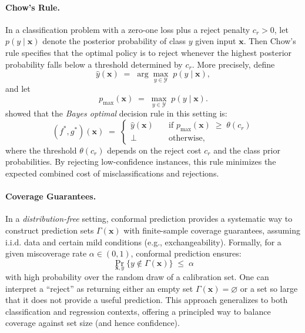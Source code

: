 \paragraph{Chow's Rule.}
In a classification problem with a zero-one loss plus a reject penalty $c_r > 0$, let $p(y \mid \bm{x})$ denote the posterior probability of class $y$ given input $\bm{x}$. Then Chow's rule \citep{chow1957optimum} specifies that the optimal policy is to reject whenever the highest posterior probability falls below a threshold determined by $c_r$. More precisely, define
\begin{equation}
\hat{y}(\bm{x}) \;=\; \arg\max_{y\in\mathcal{Y}} \;p(y \mid \bm{x}),
\end{equation}
and let 
\begin{equation}
p_{\max}(\bm{x}) \;=\; \max_{y\in\mathcal{Y}} \; p(y \mid \bm{x}).
\end{equation}
\citet{chow1957optimum} showed that the \emph{Bayes optimal} decision rule in this setting is:
\begin{equation}
(f^\ast, g^\ast)(\bm{x}) \;=\; \begin{cases}
\hat{y}(\bm{x}) \quad &\text{if } p_{\max}(\bm{x}) \;\geq\; \theta(c_r) \\
\bot \quad &\text{otherwise},
\end{cases}
\end{equation}
where the threshold $\theta(c_r)$ depends on the reject cost $c_r$ and the class prior probabilities. By rejecting low-confidence instances, this rule minimizes the expected combined cost of misclassifications and rejections.

\paragraph{Coverage Guarantees.}
In a \emph{distribution-free} setting, conformal prediction provides a systematic way to construct prediction sets $\Gamma(\bm{x})$ with finite-sample coverage guarantees, assuming i.i.d. data and certain mild conditions (e.g., exchangeability). Formally, for a given miscoverage rate $\alpha \in (0,1)$, conformal prediction ensures:
\begin{equation}
\Pr_{\bm{x}, y}\bigl\{ y \notin \Gamma(\bm{x}) \bigr\} \;\le\; \alpha
\end{equation}
with high probability over the random draw of a calibration set. One can interpret a ``reject'' as returning either an empty set $\Gamma(\bm{x}) = \varnothing$ or a set so large that it does not provide a useful prediction. This approach generalizes to both classification and regression contexts, offering a principled way to balance coverage against set size (and hence confidence).


